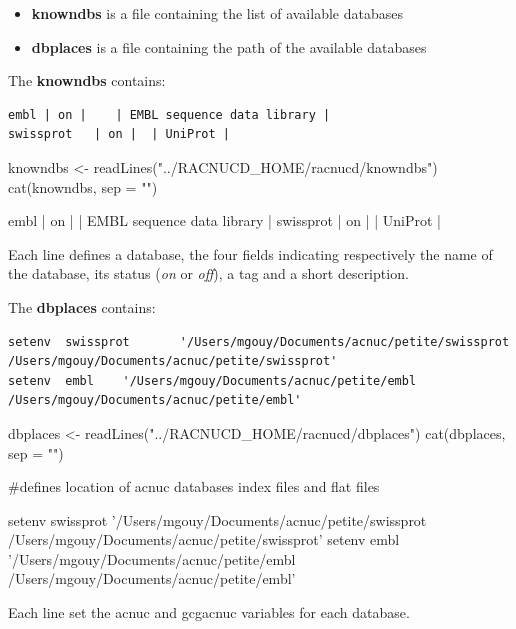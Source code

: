 \documentclass{article}
\begin{document}
\begin{itemize}
\item \textbf{knowndbs} is a file containing the list of available databases
\item \textbf{dbplaces} is a file containing the path of the available databases
\end{itemize}

The \textbf{knowndbs} contains:
\begin{verbatim}
embl | on |    | EMBL sequence data library | 
swissprot   | on |  | UniProt |
\end{verbatim}

\begin{Schunk}
\begin{Sinput}
 knowndbs <- readLines("../RACNUCD_HOME/racnucd/knowndbs")
 cat(knowndbs, sep = "\n")
\end{Sinput}
\begin{Soutput}
embl | on |    | EMBL sequence data library | 
swissprot   | on |  | UniProt |
\end{Soutput}
\end{Schunk}

Each line defines a database,  the four fields indicating respectively the name
 of the database, its status  (\textit{on} or \textit{off}), a tag and a short description.

The \textbf{dbplaces} contains:
\begin{verbatim}
setenv  swissprot       '/Users/mgouy/Documents/acnuc/petite/swissprot /Users/mgouy/Documents/acnuc/petite/swissprot'
setenv  embl    '/Users/mgouy/Documents/acnuc/petite/embl /Users/mgouy/Documents/acnuc/petite/embl'
\end{verbatim}

\begin{Schunk}
\begin{Sinput}
 dbplaces <- readLines("../RACNUCD_HOME/racnucd/dbplaces")
 cat(dbplaces, sep = "\n")
\end{Sinput}
\begin{Soutput}
#defines location of acnuc databases index files and flat files

setenv 	swissprot 	'/Users/mgouy/Documents/acnuc/petite/swissprot /Users/mgouy/Documents/acnuc/petite/swissprot'
setenv 	embl 	'/Users/mgouy/Documents/acnuc/petite/embl /Users/mgouy/Documents/acnuc/petite/embl'
\end{Soutput}
\end{Schunk}

Each line set the acnuc and gcgacnuc variables for each   database.
\end{document}
